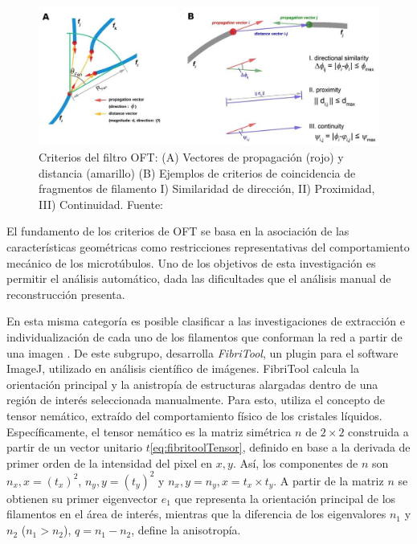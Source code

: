 \begin{figure}[h]
        \centering
        \includegraphics[scale=1.3]{imagenes/MT-OFT.jpeg}
        \caption{Criterios del filtro OFT: (A) Vectores de propagaci\'on (rojo) y distancia (amarillo) (B) Ejemplos de criterios de coincidencia de fragmentos de filamento I) Similaridad de direcci\'on, II) Proximidad, III) Continuidad. Fuente: \cite{zhang2017extracting}}
        \label{fig:MTOFT}
\end{figure}


El fundamento de los criterios de OFT se basa en la asociaci\'on de las caracter\'isticas geom\'etricas como restricciones representativas del comportamiento mec\'anico de los microt\'ubulos. Uno de los objetivos de esta investigaci\'on es permitir el an\'alisis autom\'atico, dada las dificultades que el an\'alisis manual de reconstrucci\'on presenta. %


En esta misma categor\'ia es posible clasificar a las investigaciones de extracci\'on e individualizaci\'on de cada uno de los filamentos que conforman la red a partir de una imagen \cite{doi:10.1021/ma502264c}\cite{boudaoud2014fibriltool}\cite{lichtenstein2003quantitative}\cite{alioscha2016robust}\cite{xu2015soax}.
De este subgrupo, \cite{boudaoud2014fibriltool} desarrolla \textit{FibriTool}, un plugin para el software ImageJ, utilizado en an\'alisis cient\'ifico de im\'agenes. FibriTool calcula la orientaci\'on principal y la anistrop\'ia de estructuras alargadas dentro de una regi\'on de inter\'es seleccionada manualmente. Para esto, utiliza el concepto de tensor nem\'atico, extra\'ido del comportamiento f\'isico de los cristales l\'iquidos. Espec\'ificamente, el tensor nem\'atico es la matriz sim\'etrica $n$ de $2\times2$ construida a partir de un vector unitario $t$\eqref{eq:fibritoolTensor}, definido en base a la derivada de primer orden de la intensidad del pixel en $x,y$. As\'i, los componentes de $n$ son $n_x,x = (t_x)^2$, $n_y,y = (t_y)^2$ y $n_x,y = n_y,x = t_x \times t_y$. 
A partir de la matriz $n$ se obtienen su primer eigenvector $e_1$ que representa la orientaci\'on principal de los filamentos en el \'area de inter\'es, mientras que la diferencia de los eigenvalores $n_1$ y $n_2$ ($n_1 > n_2$), $ q = n_1 - n_2$, define la anisotrop\'ia.

